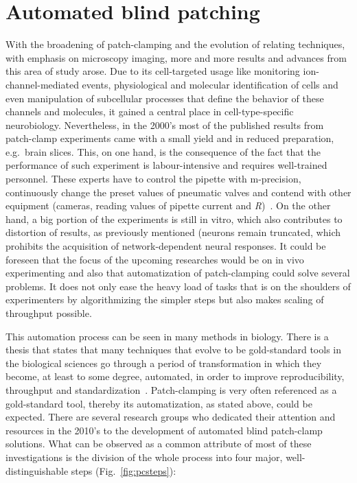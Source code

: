 \documentclass[12pt,a4paper]{report}
\begin{document}
\chapter{Automated blind patching}
With the broadening of patch-clamping and the evolution of relating techniques, with emphasis on microscopy imaging, more and more results and advances from this area of study arose. Due to its cell-targeted usage like monitoring ion-channel-mediated events, physiological and molecular identification of cells and even manipulation of subcellular processes that define the behavior of these channels and molecules, it gained a central place in cell-type-specific neurobiology. Nevertheless, in the 2000's most of the published results from patch-clamp experiments came with a small yield and in reduced preparation, e.g.\ brain slices. This, on one hand, is the consequence of the fact that the performance of such experiment is labour-intensive and requires well-trained personnel. These experts have to control the pipette with \textmu m-precision, continuously change the preset values of pneumatic valves and contend with other equipment (cameras, reading values of pipette current and \textit{R})~\cite{desai2015}. On the other hand, a big portion of the experiments is still in vitro, which also contributes to distortion of results, as previously mentioned (neurons remain truncated, which prohibits the acquisition of network-dependent neural responses. It could be foreseen that the focus of the upcoming researches would be on in vivo experimenting and also that automatization of patch-clamping could solve several problems. It does not only ease the heavy load of tasks that is on the shoulders of experimenters by algorithmizing the simpler steps but also makes scaling of throughput possible.\par
This automation process can be seen in many methods in biology. There is a thesis that states that many techniques that evolve to be gold-standard tools in the biological sciences go through a period of transformation in which they become, at least to some degree, automated, in order to improve reproducibility, throughput and standardization~\cite{suk2019}. Patch-clamping is very often referenced as a gold-standard tool, thereby its automatization, as stated above, could be expected. There are several research groups who dedicated their attention and resources in the 2010's to the development of automated blind patch-clamp solutions. What can be observed as a common attribute of most of these investigations is the division of the whole process into four major, well-distinguishable steps (Fig.~\ref{fig:pcsteps}):
\end{document}
